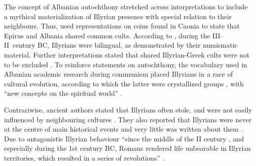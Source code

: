 	
	The concept of Albanian autochthony stretched across interpretations to include a mythical materialization of Illyrian presence with special relation to their neighbours. Thus, \textcite{Tzouvara-Souli1993} used representations on coins found in Caonia to state that Epirus and Albania shared common cults. According to \textcite[342]{Waibank1974}, during the III--II\ century BC, Illyrians were bilingual, as demonstrated by their numismatic material. Further interpretations stated that shared Illyrian-Greek cults were not to be excluded \parencite[147]{Meta2006}. To reinforce statements on autochthony, the vocabulary used in Albanian academic research during communism placed Illyrians in a race of cultural evolution, according to which the latter were crystallized groups \parencite[95]{Prendi1985}, with “new concepts on the spiritual world” \parencite[trans.][271]{Aliu1985}.
	
	Contrariwise, ancient authors stated that Illyrians often stole, and were not easily influenced by neighbouring cultures \parencites{Islami2002}{Ceka1974}{Anamali1987}. They also reported that Illyrians were never at the centre of main historical events and very little was written about them \parencite[371]{Franke1974}. Due to antagonistic Illyrian behaviour ``since the middle of the II century \BC, and especially during the 1st century BC, Romans rendered life unbearable in Illyrian territories, which resulted in a series of revolutions'' \parencite[trans.][6]{Anamali1987}. 
		
	
